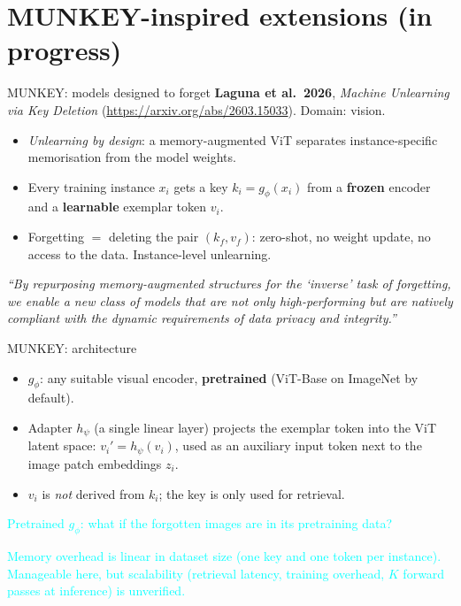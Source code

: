 \documentclass{beamer}
\newcommand{\pierre}[1]{\textcolor{cyan}{#1}}
\begin{document}
\section{MUNKEY-inspired extensions (in progress)}

\begin{frame}{MUNKEY: models designed to forget}
\textbf{Laguna et al.\ 2026}, \emph{Machine Unlearning via Key Deletion}
(\url{https://arxiv.org/abs/2603.15033}). Domain: vision.

\medskip
\begin{itemize}
  \item \emph{Unlearning by design}: a memory-augmented ViT separates
        instance-specific memorisation from the model weights.
  \item Every training instance $x_i$ gets a key $k_i = g_\phi(x_i)$ from a
        \textbf{frozen} encoder and a \textbf{learnable} exemplar token $v_i$.
  \item Forgetting $=$ deleting the pair $(k_f, v_f)$: zero-shot, no weight
        update, no access to the data. Instance-level unlearning.
\end{itemize}

\medskip
\textit{``By repurposing memory-augmented structures for the `inverse' task of
forgetting, we enable a new class of models that are not only high-performing
but are natively compliant with the dynamic requirements of data privacy and
integrity.''}
\end{frame}

\begin{frame}{MUNKEY: architecture}
\begin{itemize}
  \item $g_\phi$: any suitable visual encoder, \textbf{pretrained} (ViT-Base
        on ImageNet by default).
  \item Adapter $h_\psi$ (a single linear layer) projects the exemplar token
        into the ViT latent space: $v_i' = h_\psi(v_i)$, used as an auxiliary
        input token next to the image patch embeddings $z_i$.
  \item $v_i$ is \emph{not} derived from $k_i$; the key is only used for
        retrieval.
\end{itemize}

\medskip
\pierre{Pretrained $g_\phi$: what if the forgotten images are in its
pretraining data?}

\medskip
\pierre{Memory overhead is linear in dataset size (one key and one token per
instance). Manageable here, but scalability (retrieval latency, training
overhead, $K$ forward passes at inference) is unverified.}
\end{frame}
\end{document}
